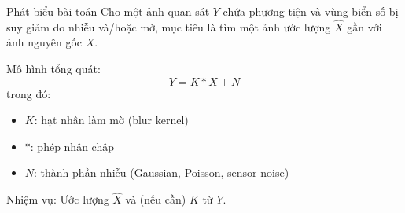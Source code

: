 
\begin{frame}{Phát biểu bài toán}
    Cho một ảnh quan sát $Y$ chứa phương tiện và vùng biển số bị suy giảm do nhiễu và/hoặc mờ, mục tiêu là tìm một ảnh ước lượng $\hat{X}$ gần với ảnh nguyên gốc $X$.
    
    \vspace{0.5cm}
    Mô hình tổng quát:
    \begin{equation}
        Y = K * X + N
    \end{equation}
    trong đó:
    \begin{itemize}
        \item $K$: hạt nhân làm mờ (blur kernel)
        \item $*$: phép nhân chập
        \item $N$: thành phần nhiễu (Gaussian, Poisson, sensor noise)
    \end{itemize}
    
    \vspace{0.3cm}
    Nhiệm vụ: Ước lượng $\hat{X}$ và (nếu cần) $K$ từ $Y$.
\end{frame}
